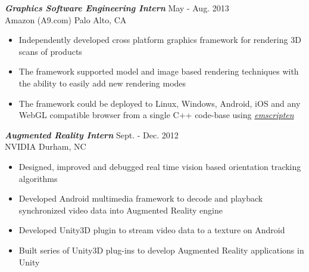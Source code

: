 \documentclass[line,10pt]{res}
\newcommand{\resumetitlemar}{0.5em}
\begin{document}
\begin{resume}
{\sl \textbf{Graphics Software Engineering Intern}} \hfill May - Aug. 2013 \\
Amazon (A9.com) \hfill Palo Alto, CA\null
\vspace{\resumetitlemar}
\begin{itemize}  \itemsep -2pt
\item Independently developed cross platform graphics framework for rendering 3D scans of products
\item The framework supported model and image based rendering techniques with the ability to easily add new rendering modes
\item The framework could be deployed to Linux, Windows, Android, iOS and any WebGL compatible browser from a single C++ code-base using \href{https://github.com/kripken/emscripten}{\textit{emscripten}}
\end{itemize}

{\sl \textbf{Augmented Reality Intern}} \hfill Sept. - Dec. 2012 \\
NVIDIA \hfill Durham, NC\null
\vspace{\resumetitlemar}
\begin{itemize} \itemsep -2pt
\item Designed, improved and debugged real time vision based orientation tracking algorithms
\item Developed Android multimedia framework to decode and playback synchronized video data into Augmented Reality engine
\item Developed Unity3D plugin to stream video data to a texture on Android
\item Built series of Unity3D plug-ins to develop Augmented Reality applications in Unity
\end{itemize}



\end{resume}
\end{document}
